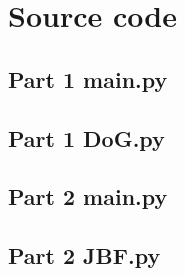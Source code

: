 \documentclass[a4paper, 12pt]{article}
\begin{document}
\section{Source code}
\subsection{Part 1 main.py}

\subsection{Part 1 DoG.py}

\subsection{Part 2 main.py}

\subsection{Part 2 JBF.py}




\end{document}
